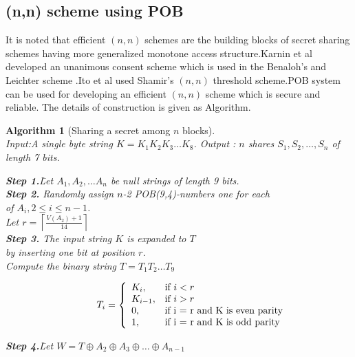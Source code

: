 \documentclass{llncs}
\newtheorem{algorithm}{Algorithm}
\begin{document}
\subsection{(n,n) scheme using POB}
It is noted that efficient $(n,n)$ schemes are the building blocks of secret sharing schemes having more generalized monotone access structure.Karnin \cite{karnin1983} et al developed an unanimous consent scheme which is used in the Benaloh's and Leichter scheme \cite{benaloh1990generalized}.Ito et al \cite{ito1989secret} used Shamir's $(n,n)$ threshold scheme.POB system can be used for developing an efficient $(n,n)$ scheme which is secure and reliable.
The details of construction is given as Algorithm.\\ 
\begin{algorithm}[Sharing a secret among $n$ blocks] \ \\
\label{alg:BShrN}
Input:A single byte string $K = K_1K_2K_3\ldots K_8$. \newline
Output : $n$ shares $S_1, S_2, \ldots, S_n$ of length 7 bits.\\
\begin{tabbing}
\textbf{Step 1.}\;\= Let $A_1 , A_2, \ldots A_n$ be null strings of length 9 bits.\\
\textbf{Step 2.}\> Randomly assign $n$-2 POB(9,4)-numbers one for each \\
                \> of $A_i, 2 \leq i \leq n-1$.\\
                \> Let $r = \left\lceil\frac{V(A_2) + 1}{14}\right\rceil$ \\
\textbf{Step 3.}\> The input string $K$ is expanded to $T$\\\> by inserting one bit at position $r$.\\
                \> Compute the binary string \mbox{$T = T_1T_2 \ldots T_9$}
\end{tabbing}\[\hspace*{0.4in} T_i = \left\{ \begin{array}{ll}
                       K_i, & \mbox{if $i < r$} \\
                       K_{i-1},  & \mbox{if $i > r$} \\
                       0, & \mbox{if i = r and K is even parity} \\
                       1, & \mbox{if i = r and K is odd parity}\\
\end{array}
\right. \]
\begin{tabbing}
\textbf{Step 4.}\;\= Let $W = T \oplus A_2 \oplus A_3 \oplus \ldots \oplus A_{n-1}$\\

\end{tabbing}
\end{algorithm}
\end{document}
